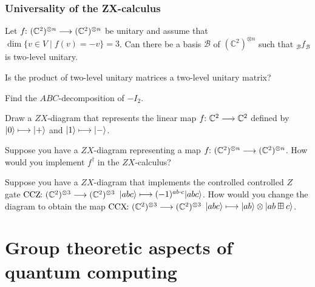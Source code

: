 \documentclass[a4paper, oneside, 12pt]{amsart}
\begin{document}
\subsubsection*{Universality of the ZX-calculus}
\begin{thmlist}
  \item Let \(f \from ( \mathbb{C}^{2})^{\otimes n }\to ( \mathbb{C}^{2})^{ \otimes n}\) be unitary and assume that \(\dim \{v\in V \mid f(v) = -v\} =3\).
  Can there be a basis \(\mathcal{B}\) of \(( \mathbb{C}^{2})^{\otimes n}\) such that \({}_{\mathcal{B}}f_{\mathcal{B}}\) is two-level unitary.
  \item Is the product of two-level unitary matrices a two-level unitary matrix?
  \item Find the \(ABC\)-decomposition of \(-I_{2}\).
  \item Draw a \(ZX\)-diagram that represents the linear map \(f \from \mathbb{C}^{2} \to \mathbb{C}^{2}\) defined by \(\lvert0\rangle \longmapsto \lvert+\rangle\) and  \(\lvert1\rangle \longmapsto \lvert-\rangle\).
  \item Suppose you have a \(ZX\)-diagram representing a map \(f \from ( \mathbb{C}^{2})^{\otimes n} \to ( \mathbb{C}^{2})^{\otimes n}\). How would you implement \(f^{\dagger}\) in the \(ZX\)-calculus?
  \item Suppose you have a \(ZX\)-diagram that implements the controlled controlled \(Z\) gate \(\mathrm{CCZ}\from ( \mathbb{C}^{2})^{\otimes 3} \to ( \mathbb{C}^{2})^{\otimes 3}\) \(\lvert abc\rangle \longmapsto (-1)^{ab \cdot c} \lvert abc\rangle\).
  How would you change the diagram to obtain the map \(\mathrm{CCX}\from ( \mathbb{C}^{2})^{\otimes 3} \to ( \mathbb{C}^{2})^{\otimes 3}\) \(\lvert abc\rangle \longmapsto  \lvert ab\rangle\otimes \lvert ab \boxplus c\rangle\).
\end{thmlist}
\cleardoublepage

\section{Group theoretic aspects of quantum computing}\label{sec:groups-and-the-gottesman-knill-theorem}
\end{document}
